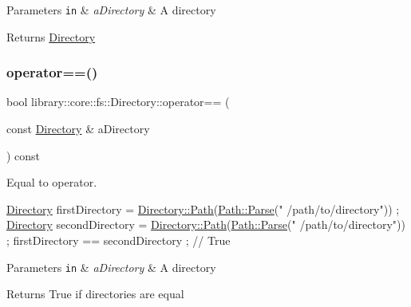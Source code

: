 \begin{DoxyParams}[1]{Parameters}
\mbox{\tt in}  & {\em a\+Directory} & A directory \\
\hline
\end{DoxyParams}
\begin{DoxyReturn}{Returns}
\hyperlink{classlibrary_1_1core_1_1fs_1_1_directory}{Directory} 
\end{DoxyReturn}
\mbox{\label{classlibrary_1_1core_1_1fs_1_1_directory_a7d1a76c04ba3750606c3f22519d0ef66}} 
\subsubsection{\texorpdfstring{operator==()}{operator==()}}
{\footnotesize\ttfamily bool library\+::core\+::fs\+::\+Directory\+::operator== (\begin{DoxyParamCaption}\item[{const \hyperlink{classlibrary_1_1core_1_1fs_1_1_directory}{Directory} \&}]{a\+Directory }\end{DoxyParamCaption}) const}



Equal to operator. 


\begin{DoxyCode}
\hyperlink{classlibrary_1_1core_1_1fs_1_1_directory_a3ec39f6cad19a81d520e9a1f2d8bb1f7}{Directory} firstDirectory = \hyperlink{classlibrary_1_1core_1_1fs_1_1_directory_ae906e33e4659219cf296dd314c7726b8}{Directory::Path}(\hyperlink{classlibrary_1_1core_1_1fs_1_1_path_a6ba644b6609507e724c217bf2020f5ae}{Path::Parse}(\textcolor{stringliteral}{"
      /path/to/directory"})) ;
\hyperlink{classlibrary_1_1core_1_1fs_1_1_directory_a3ec39f6cad19a81d520e9a1f2d8bb1f7}{Directory} secondDirectory = \hyperlink{classlibrary_1_1core_1_1fs_1_1_directory_ae906e33e4659219cf296dd314c7726b8}{Directory::Path}(\hyperlink{classlibrary_1_1core_1_1fs_1_1_path_a6ba644b6609507e724c217bf2020f5ae}{Path::Parse}(\textcolor{stringliteral}{"
      /path/to/directory"})) ;
firstDirectory == secondDirectory ; \textcolor{comment}{// True}
\end{DoxyCode}



\begin{DoxyParams}[1]{Parameters}
\mbox{\tt in}  & {\em a\+Directory} & A directory \\
\hline
\end{DoxyParams}
\begin{DoxyReturn}{Returns}
True if directories are equal 
\end{DoxyReturn}
\mbox{\label{classlibrary_1_1core_1_1fs_1_1_directory_ae906e33e4659219cf296dd314c7726b8}} 
